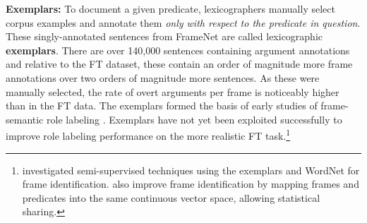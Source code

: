 \documentclass[11pt,a4paper]{article}
\newcommand{\ensuretext}[1]{#1}
\newcommand{\nssmarker}{\ensuretext{\textcolor{magenta}{\ensuremath{^{\textsc{NS}}_{\textsc{S}}}}}}
\newcommand{\mkmarker}{\ensuretext{\textcolor{red}{\ensuremath{^{\textsc{M}}_{\textsc{K}}}}}}
\newcommand{\stmarker}{\ensuretext{\textcolor{orange}{\ensuremath{^{\textsc{S}}_{\textsc{T}}}}}}
\newcommand{\arkcomment}[3]{\ensuretext{\textcolor{#3}{[#1 #2]}}}
\newcommand{\nss}[1]{\arkcomment{\nssmarker}{#1}{magenta}}
\newcommand{\mk}[1]{\arkcomment{\mkmarker}{#1}{red}}
\newcommand{\st}[1]{\arkcomment{\stmarker}{#1}{orange}}
\begin{document}
\noindent\textbf{Exemplars:} To document a given predicate, lexicographers manually select corpus examples and annotate them
\emph{only with respect to the predicate in question}.
These singly-annotated sentences from FrameNet are called lexicographic \textbf{exemplars}.
There are over 140,000 sentences containing argument annotations %
and relative to the FT dataset, these contain an order of magnitude more frame annotations
over two orders of magnitude 
more sentences. As these were manually selected, the rate of overt arguments per frame
is noticeably higher than in the FT data.
The exemplars formed the basis of early studies of frame-semantic role
labeling \citep[e.g.,][]{gildea-02,thompson-03,fleischman-03,litkowski-04,kwon-04}.
Exemplars have not yet been exploited successfully to improve
role labeling performance on the more realistic FT task.\footnote{\citet{das-11,das-12} investigated semi-supervised techniques using the exemplars and WordNet for frame identification.
\citet{hermann-14} also improve frame identification by mapping frames
and predicates into the same continuous vector space, allowing
statistical sharing.}
\end{document}
